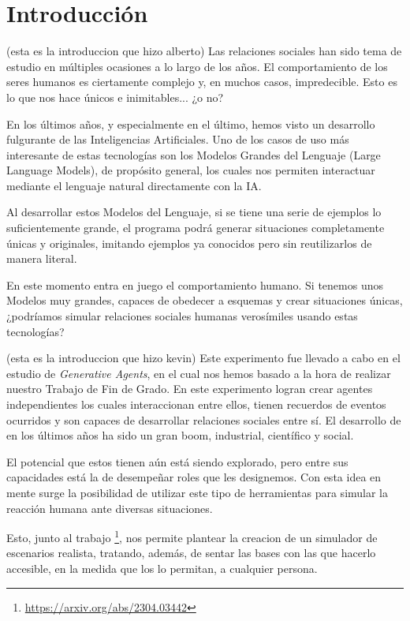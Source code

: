 \chapter{Introducción}
\label{cap:introduccion}


(esta es la introduccion que hizo alberto)
Las relaciones sociales han sido tema de estudio en múltiples ocasiones a lo largo de los años. El comportamiento de los seres humanos es ciertamente complejo y, en muchos casos, impredecible. Esto es lo que nos hace únicos e inimitables... ¿o no?

En los últimos años, y especialmente en el último, hemos visto un desarrollo fulgurante de las Inteligencias Artificiales. Uno de los casos de uso más interesante de estas tecnologías son los Modelos Grandes del Lenguaje (Large Language Models), de propósito general, los cuales nos permiten interactuar mediante el lenguaje natural directamente con la IA.

Al desarrollar estos Modelos del Lenguaje, si se tiene una serie de ejemplos lo suficientemente grande, el programa podrá generar situaciones completamente únicas y originales, imitando ejemplos ya conocidos pero sin reutilizarlos de manera literal.

En este momento entra en juego el comportamiento humano. Si tenemos unos Modelos muy grandes, capaces de obedecer a esquemas y crear situaciones únicas, ¿podríamos simular relaciones sociales humanas verosímiles usando estas tecnologías?

(esta es la introduccion que hizo kevin)
Este experimento fue llevado a cabo en el estudio de \textit{Generative Agents}, en el cual nos hemos basado a la hora de realizar nuestro Trabajo de Fin de Grado. En este experimento logran crear agentes independientes los cuales interaccionan entre ellos, tienen recuerdos de eventos ocurridos y son capaces de desarrollar relaciones sociales entre sí.
El desarrollo de \mgl en los últimos años ha sido un gran boom, industrial, científico y social.

El potencial que estos tienen aún está siendo explorado, pero entre sus capacidades está la de desempeñar roles que les designemos. Con esta idea en mente surge la posibilidad de utilizar este tipo de herramientas para simular la reacción humana ante diversas situaciones.

Esto, junto al trabajo \ga\footnote{\url{https://arxiv.org/abs/2304.03442}}, nos permite plantear la creacion de un simulador de escenarios realista, tratando, además, de sentar las bases con las que hacerlo accesible, en la medida que los \mgl lo permitan, a cualquier persona.

